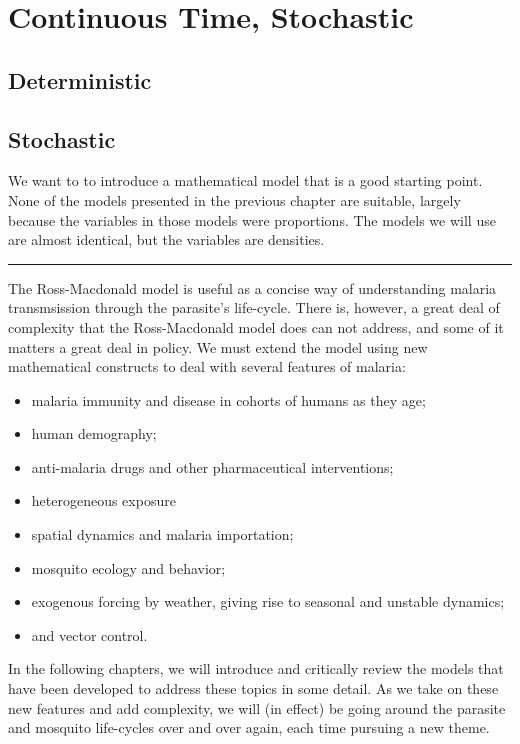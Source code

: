 \documentclass[
]{book}
\begin{document}
\section{Continuous Time, Stochastic}\label{continuous-time-stochastic}

\subsection{Deterministic}\label{deterministic}

\subsection{Stochastic}\label{stochastic}

We want to to introduce a mathematical model that is a good starting point. None of the models presented in the previous chapter are suitable, largely because the variables in those models were proportions. The models we will use are almost identical, but the variables are densities.

\begin{center}\rule{0.5\linewidth}{0.5pt}\end{center}

The Ross-Macdonald model is useful as a concise way of understanding malaria transmsission through the parasite's life-cycle. There is, however, a great deal of complexity that the Ross-Macdonald model does can not address, and some of it matters a great deal in policy. We must extend the model using new mathematical constructs to deal with several features of malaria:

\begin{itemize}
\item
  malaria immunity and disease in cohorts of humans as they age;
\item
  human demography;
\item
  anti-malaria drugs and other pharmaceutical interventions;
\item
  heterogeneous exposure
\item
  spatial dynamics and malaria importation;
\item
  mosquito ecology and behavior;
\item
  exogenous forcing by weather, giving rise to seasonal and unstable dynamics;
\item
  and vector control.
\end{itemize}

In the following chapters, we will introduce and critically review the models that have been developed to address these topics in some detail. As we take on these new features and add complexity, we will (in effect) be going around the parasite and mosquito life-cycles over and over again, each time pursuing a new theme.
\end{document}
